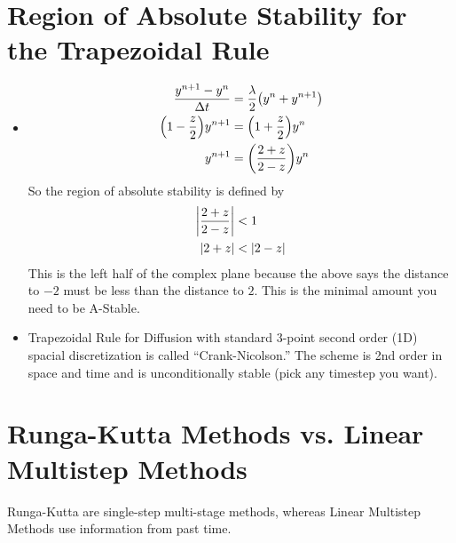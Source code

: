 \documentclass{article}
\newcommand{\Dt}{\Delta t}
\begin{document}
    \section{Region of Absolute Stability for the Trapezoidal Rule}
        \begin{itemize}
            \item
            \begin{align*}
                \frac{y^{n+1} - y^n}{\Dt} &= \frac{\lambda}{2}\qty(y^n + y^{n+1}) \\
                \qty(1 - \frac{z}{2})y^{n+1} &= \qty(1 + \frac{z}{2})y^n \\
                y^{n+1} &= \qty(\frac{2 + z}{2 - z})y^n
            \end{align*}
            So the region of absolute stability is defined by
            \begin{align*}
                \abs{\frac{2 + z}{2 - z}} &< 1 \\
                \abs{2 + z} &< \abs{2 - z}
            \end{align*}
            This is the left half of the complex plane because the above says the distance to $-2$ must be less than the distance to $2$.  This is the minimal amount you need to be A-Stable.
            \item Trapezoidal Rule for Diffusion with standard 3-point second order (1D) spacial discretization is called ``Crank-Nicolson.''  The scheme is 2nd order in space and time and is unconditionally stable (pick any timestep you want).
        \end{itemize}

    \section{Runga-Kutta Methods vs. Linear Multistep Methods}
        Runga-Kutta are single-step multi-stage methods, whereas Linear Multistep Methods use information from past time.
        
\end{document}

